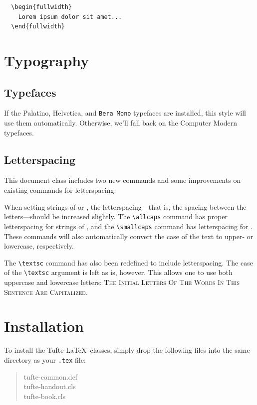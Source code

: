 \documentclass{tufte-handout}
\theoremstyle{definition}
\theoremstyle{example}
\theoremstyle{remark}
\begin{document}
\begin{Verbatim}
  \begin{fullwidth}
    Lorem ipsum dolor sit amet...
  \end{fullwidth}
\end{Verbatim}

\begin{fullwidth}
  \small\itshape\lipsum[1]
\end{fullwidth}

\section{Typography}\label{sec:typography}

\subsection{Typefaces}\label{sec:typefaces}
If the Palatino, \textsf{Helvetica}, and \texttt{Bera Mono} typefaces are
installed, this style will use them automatically. Otherwise, we'll fall back
on the Computer Modern typefaces.

\subsection{Letterspacing}\label{sec:letterspacing}
This document class includes two new commands and some improvements on existing
commands for letterspacing.

When setting strings of  or , the
letter\-spacing---that is, the spacing between the letters---should be
increased slightly.\cite{Bringhurst2005} The \Verb|\allcaps| command has proper
letterspacing for strings of , and the
\Verb|\smallcaps| command has letterspacing for . These commands will also automatically convert the case of the text
to upper- or lowercase, respectively.

The \Verb|\textsc| command has also been redefined to include letterspacing.
The case of the \Verb|\textsc| argument is left as is, however. This allows one
to use both uppercase and lowercase letters: \textsc{The Initial Letters Of The
  Words In This Sentence Are Capitalized.}

\section{Installation}\label{sec:installation}
To install the Tufte-\LaTeX\ classes, simply drop the following files into the
same directory as your \texttt{.tex} file:
\begin{quote}
  \ttfamily
  tufte-common.def\\
  tufte-handout.cls\\
  tufte-book.cls
\end{quote}
\end{document}
